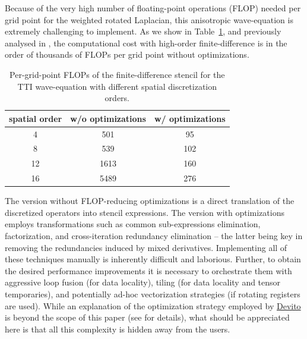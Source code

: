 \documentclass[conference]{IEEEtran}
\begin{document}
Because of the very high number of floating-point operations (FLOP)
needed per grid point for the weighted rotated Laplacian, this
anisotropic wave-equation is extremely challenging to implement. As we
show in Table~\ref{ttiFLOPs}, and previously analysed in
\cite{louboutin2016ppf}, the computational cost with high-order
finite-difference is in the order of thousands of FLOPs per grid point
without optimizations.

\begin{table}
\centering
\begin{tabular}{ccc}
\toprule\addlinespace
spatial order & w/o optimizations & w/ optimizations\tabularnewline
\midrule
4 & 501 & 95\tabularnewline
8 & 539 & 102\tabularnewline
12 & 1613 & 160\tabularnewline
16 & 5489 & 276\tabularnewline
\bottomrule
\end{tabular}
\caption{Per-grid-point FLOPs of the finite-difference stencil for the
TTI wave-equation with different spatial discretization
orders.}\label{ttiFLOPs}
\end{table}

The version without FLOP-reducing optimizations is a direct translation
of the discretized operators into stencil expressions. The version with
optimizations employs transformations such as common sub-expressions
elimination, factorization, and cross-iteration redundancy elimination
-- the latter being key in removing the redundancies induced by mixed
derivatives. Implementing all of these techniques manually is inherently
difficult and laborious. Further, to obtain the desired performance
improvements it is necessary to orchestrate them with aggressive loop
fusion (for data locality), tiling (for data locality and tensor
temporaries), and potentially ad-hoc vectorization strategies (if
rotating registers are used). While an explanation of the optimization
strategy employed by
\href{https://github.com/devitocodes/devito}{Devito} is beyond the scope
of this paper (see \cite{devito-compiler} for details), what should be
appreciated here is that all this complexity is hidden away from the
users.
\end{document}
